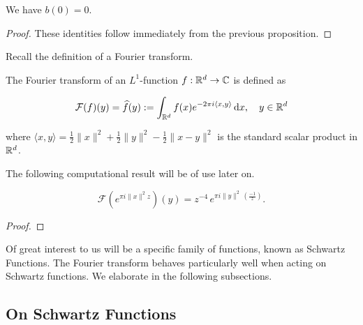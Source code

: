 \begin{proposition}\label{prop:b0}\leanok
We have $b(0) = 0$.
\end{proposition}
\begin{proof}
    These identities follow immediately from the previous proposition. %
\end{proof}


Recall the definition of a Fourier transform.

\begin{definition}\label{def:Fourier-Transform}\leanok
  The Fourier transform of an $L^1$-function $f:\mathbb{R}^d\to\mathbb{C}$ is defined as

  \[
    \mathcal{F}(f)(y) = \widehat{f}(y) := \int_{\mathbb{R}^d} f(x)e^{-2\pi i \langle x, y \rangle} \,\mathrm{d}x, \quad y \in \mathbb{R}^d
  \]

  where $\langle x, y \rangle = \frac12\|x\|^2 + \frac12\|y\|^2 - \frac12\|x - y\|^2$ is the standard scalar product in $\mathbb{R}^d$.
\end{definition}

The following computational result will be of use later on.

\begin{lemma}\label{lemma:Gaussian-Fourier}
  \begin{equation}
    \mathcal{F}(e^{\pi i \|x\|^2 z})(y) = z^{-4}\,e^{\pi i \|y\|^2 \,(\frac{-1}{z}) }.
  \end{equation}
\end{lemma}
\begin{proof}
\end{proof}

Of great interest to us will be a specific family of functions, known as Schwartz Functions. The Fourier transform behaves particularly well when acting on Schwartz functions. We elaborate in the following subsections.

\subsection{On Schwartz Functions}

